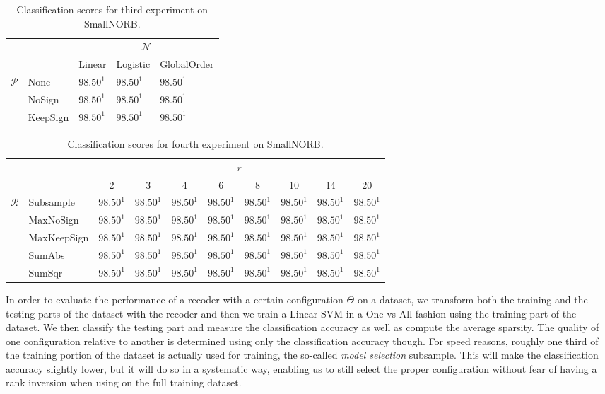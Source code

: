 \documentclass[12pt,a4paper,oneside,english]{UPBThesis}
\begin{document}
\renewcommand{\arraystretch}{1.2}
\begin{table}
  \caption{Classification scores for third experiment on SmallNORB.}
  \label{table:RecoderEvNORBSmallSmallResultsNP}
  \begin{tabularx}{\textwidth}{cR|R|R|R|}
    & &  \tabularnewline
    & & Linear & Logistic & GlobalOrder \tabularnewline\hline
     & None & $98.50^1$ & $98.50^1$ & $98.50^1$ \tabularnewline
     & NoSign & $98.50^1$ & $98.50^1$ & $98.50^1$ \tabularnewline
     & KeepSign & $98.50^1$ & $98.50^1$ & $98.50^1$ \tabularnewline\hline
  \end{tabularx}
\end{table}
\renewcommand{\arraystretch}{1.0}

\renewcommand{\arraystretch}{1.2}
\begin{table}
  \caption{Classification scores for fourth experiment on SmallNORB.}
  \label{table:RecoderEvNORBSmallSmallResultsRr}
  \begin{tabularx}{\textwidth}{cR|c|c|c|c|c|c|c|c|}
    & &  \tabularnewline
    &            & 2 & 3 & 4 & 6 & 8 & 10 & 14 & 20 \tabularnewline\hline
     & Subsample   & $98.50^1$ & $98.50^1$ & $98.50^1$ & $98.50^1$ & $98.50^1$ & $98.50^1$ & $98.50^1$ & $98.50^1$ \tabularnewline
     & MaxNoSign   & $98.50^1$ & $98.50^1$ & $98.50^1$ & $98.50^1$ & $98.50^1$ & $98.50^1$ & $98.50^1$ & $98.50^1$ \tabularnewline
     & MaxKeepSign & $98.50^1$ & $98.50^1$ & $98.50^1$ & $98.50^1$ & $98.50^1$ & $98.50^1$ & $98.50^1$ & $98.50^1$ \tabularnewline
     & SumAbs      & $98.50^1$ & $98.50^1$ & $98.50^1$ & $98.50^1$ & $98.50^1$ & $98.50^1$ & $98.50^1$ & $98.50^1$ \tabularnewline
     & SumSqr      & $98.50^1$ & $98.50^1$ & $98.50^1$ & $98.50^1$ & $98.50^1$ & $98.50^1$ & $98.50^1$ & $98.50^1$ \tabularnewline\hline
  \end{tabularx}
\end{table}
\renewcommand{\arraystretch}{1.0}

In order to evaluate the performance of a recoder with a certain configuration $\Theta$ on a dataset, we transform both the training and the testing parts of the dataset with the recoder and then we train a Linear SVM in a One-vs-All fashion using the training part of the dataset. We then classify the testing part and measure the classification accuracy as well as compute the average sparsity. The quality of one configuration relative to another is determined using only the classification accuracy though. For speed reasons, roughly one third of the training portion of the dataset is actually used for training, the so-called \emph{model selection} subsample. This will make the classification accuracy slightly lower, but it will do so in a systematic way, enabling us to still select the proper configuration without fear of having a rank inversion when using on the full training dataset.
\end{document}
